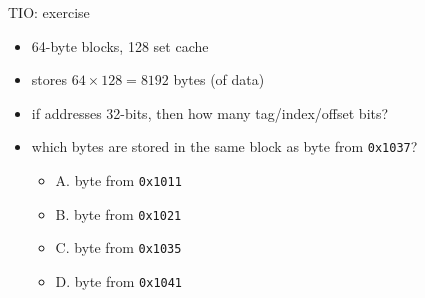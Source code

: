\begin{frame}{TIO: exercise}
    \begin{itemize}
    \item 64-byte blocks, 128 set cache
    \item stores $64 \times 128 = 8192$ bytes (of data)
    \item if addresses 32-bits, then how many tag/index/offset bits?
    \vspace{.5cm}
    \item which bytes are stored in the same block as byte from \texttt{0x1037}?
        \begin{itemize}
        \item A. byte from \texttt{0x1011}
        \item B. byte from \texttt{0x1021}
        \item C. byte from \texttt{0x1035}
        \item D. byte from \texttt{0x1041}
        \end{itemize}
    \end{itemize}
\end{frame}
